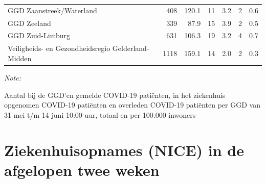 \documentclass[
  english,
  man,floatsintext]{apa6}
\begin{document}
\begin{table}
\begin{threeparttable}
\begin{tabular}{lrrrrrr}
GGD Zaanstreek/Waterland & 408 & 120.1 & 11 & 3.2 & 2 & 0.6\\
GGD Zeeland & 339 & 87.9 & 15 & 3.9 & 2 & 0.5\\
GGD Zuid-Limburg & 631 & 106.3 & 19 & 3.2 & 4 & 0.7\\
Veiligheids- en Gezondheidsregio Gelderland-Midden & 1118 & 159.1 & 14 & 2.0 & 2 & 0.3\\
\bottomrule
\end{tabular}
\begin{tablenotes}
\item \textit{Note: } 
\item Aantal bij de GGD’en gemelde COVID-19 patiënten, in het ziekenhuis opgenomen COVID-19 patiënten en overleden COVID-19 patiënten per GGD van 31 mei t/m 14 juni 10:00 uur, totaal en per 100.000 inwoners
\end{tablenotes}
\end{threeparttable}
\endgroup{}
\end{table}

\newpage

\hypertarget{ziekenhuisopnames-nice-in-de-afgelopen-twee-weken}{%
\section{Ziekenhuisopnames (NICE) in de afgelopen twee weken}\label{ziekenhuisopnames-nice-in-de-afgelopen-twee-weken}}
\end{document}
